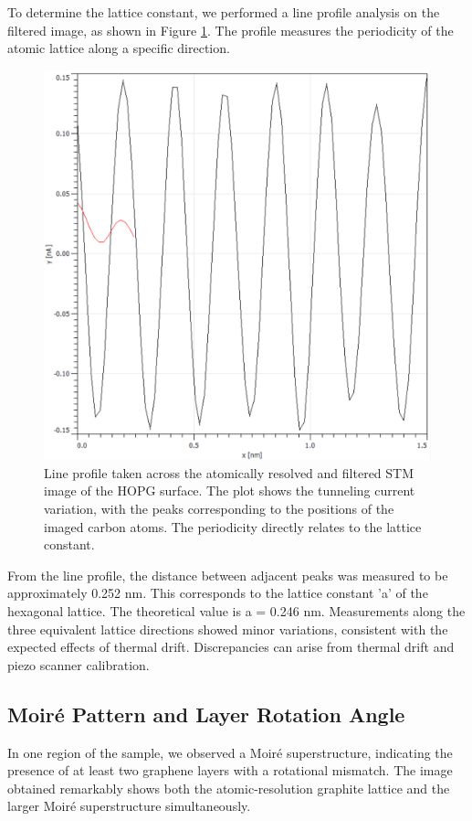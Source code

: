 \documentclass[12pt,a4paper]{article}
\begin{document}
To determine the lattice constant, we performed a line profile analysis on the filtered image, as shown in Figure \ref{fig:atomic-res}. The profile measures the periodicity of the atomic lattice along a specific direction.

\begin{figure}[H]
    \centering
    \includegraphics[width=0.8\linewidth]{../data/tasks/3/intermolecular_distance.PNG}
    \caption{Line profile taken across the atomically resolved and filtered STM image of the HOPG surface. The plot shows the tunneling current variation, with the peaks corresponding to the positions of the imaged carbon atoms. The periodicity directly relates to the lattice constant.}
    \label{fig:atomic-res}
\end{figure}

From the line profile, the distance between adjacent peaks was measured to be approximately 0.252 nm. This corresponds to the lattice constant 'a' of the hexagonal lattice. The theoretical value is a = 0.246 nm. Measurements along the three equivalent lattice directions showed minor variations, consistent with the expected effects of thermal drift. Discrepancies can arise from thermal drift and piezo scanner calibration.

\subsection{Moiré Pattern and Layer Rotation Angle}
In one region of the sample, we observed a Moiré superstructure, indicating the presence of at least two graphene layers with a rotational mismatch. The image obtained remarkably shows both the atomic-resolution graphite lattice and the larger Moiré superstructure simultaneously.
\end{document}
